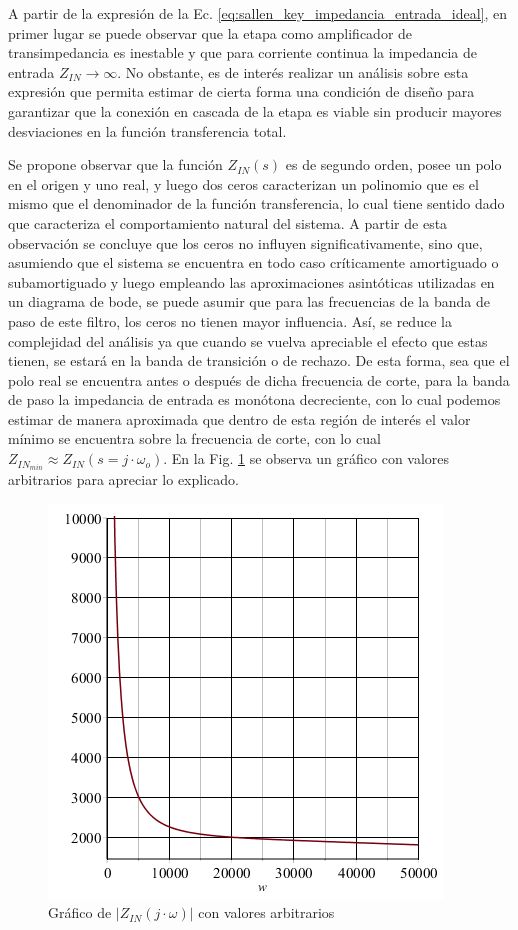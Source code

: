 A partir de la expresi\'on de la Ec. \ref{eq:sallen_key_impedancia_entrada_ideal}, en primer lugar se puede observar que la etapa como amplificador de transimpedancia es inestable y que para corriente continua la impedancia de entrada $Z_{IN} \rightarrow \infty$.
No obstante, es de inter\'es realizar un an\'alisis sobre esta expresi\'on que permita estimar de cierta forma una condici\'on de dise\~no para garantizar que la conexi\'on en cascada de la etapa es viable sin producir mayores desviaciones en la funci\'on transferencia total.

Se propone observar que la funci\'on $Z_{IN}(s)$ es de segundo orden, posee un polo en el origen y uno real, y luego dos ceros caracterizan un polinomio que es el mismo que el denominador de la funci\'on transferencia, lo cual tiene sentido
dado que caracteriza el comportamiento natural del sistema. A partir de esta observaci\'on se concluye que los ceros no influyen significativamente, sino que, asumiendo que el sistema se encuentra en todo caso cr\'iticamente amortiguado o subamortiguado y luego empleando las aproximaciones asint\'oticas
utilizadas en un diagrama de bode, se puede asumir que para las frecuencias de la banda de paso de este filtro, los ceros no tienen mayor influencia. As\'i, se reduce la complejidad del an\'alisis ya que cuando se vuelva apreciable el efecto que estas tienen, se estar\'a en la banda de transici\'on o de rechazo.
De esta forma, sea que el polo real se encuentra antes o despu\'es de dicha frecuencia de corte, para la banda de paso la impedancia de entrada es mon\'otona decreciente, con lo cual podemos estimar de manera aproximada que dentro de esta regi\'on de inter\'es el valor m\'inimo se encuentra sobre la frecuencia de corte,
con lo cual $Z_{IN_{min}} \approx Z_{IN}(s=j \cdot \omega_o)$. En la Fig. \ref{fig:grafico_zin_ideal_arbitraria} se observa un gr\'afico con valores arbitrarios para apreciar lo explicado.

\begin{figure}[H]
	\centering
	\includegraphics[scale=0.6]{../EJ1/Recursos/impedancia_entrada_arbitraria.png}
	\caption{Gr\'afico de $|Z_{IN}(j \cdot \omega)|$ con valores arbitrarios}
	\label{fig:grafico_zin_ideal_arbitraria}
\end{figure}

